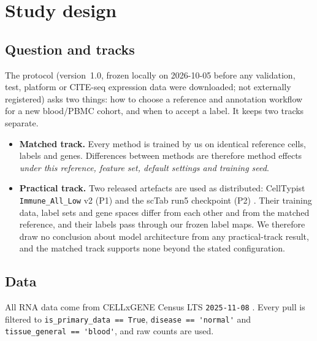 \documentclass[11pt]{article}
\begin{document}
\section{Study design}\label{sec:design}

\subsection{Question and tracks}

The protocol (version~1.0, frozen locally on 2026-10-05 before any validation, test, platform or CITE-seq expression data were downloaded; not externally registered) asks two things: how to choose a reference and annotation workflow for a new blood/PBMC cohort, and when to accept a label. It keeps two tracks separate.

\begin{itemize}
\item \textbf{Matched track.} Every method is trained by us on identical reference cells, labels and genes. Differences between methods are therefore method effects \emph{under this reference, feature set, default settings and training seed}.
\item \textbf{Practical track.} Two released artefacts are used as distributed: CellTypist \nolinkurl{Immune_All_Low} v2 (P1) \citep{celltypistmodels} and the scTab run5 checkpoint (P2) \citep{fischer2024sctab,sctabrepo}. Their training data, label sets and gene spaces differ from each other and from the matched reference, and their labels pass through our frozen label maps. We therefore draw no conclusion about model architecture from any practical-track result, and the matched track supports none beyond the stated configuration.
\end{itemize}

\subsection{Data}

All RNA data come from CELLxGENE Census LTS \texttt{2025-11-08} \citep{czi2025cellxgene,censusreleases}. Every pull is filtered to \verb|is_primary_data == True|, \verb|disease == 'normal'| and \verb|tissue_general == 'blood'|, and raw counts are used.
\end{document}
